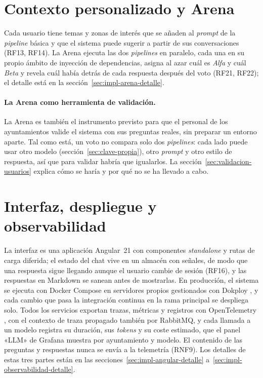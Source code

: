 \section{Contexto personalizado y Arena}
\label{sec:impl-arena}

Cada usuario tiene temas y zonas de interés que se añaden al \emph{prompt} de la \emph{pipeline} básica y que el sistema puede sugerir a partir de sus conversaciones (RF13, RF14). La Arena ejecuta las dos \emph{pipelines} en paralelo, cada una en su propio ámbito de inyección de dependencias, asigna al azar cuál es \emph{Alfa} y cuál \emph{Beta} y revela cuál había detrás de cada respuesta después del voto (RF21, RF22); el detalle está en la sección~\ref{sec:impl-arena-detalle}.

\paragraph{La Arena como herramienta de validación.} La Arena es también el instrumento previsto para que el personal de los ayuntamientos valide el sistema con sus preguntas reales, sin preparar un entorno aparte. Tal como está, un voto no compara solo dos \emph{pipelines}: cada lado puede usar otro modelo (sección~\ref{sec:clave-propia}), otro \emph{prompt} y otro estilo de respuesta, así que para validar habría que igualarlos. La sección~\ref{sec:validacion-usuarios} explica cómo se haría y por qué no se ha llevado a cabo.

\section{Interfaz, despliegue y observabilidad}
\label{sec:impl-angular}
\label{sec:impl-despliegue}
\label{sec:impl-observabilidad}

La interfaz es una aplicación Angular~21 \cite{angular} con componentes \emph{standalone} y rutas de carga diferida; el estado del chat vive en un almacén con señales, de modo que una respuesta sigue llegando aunque el usuario cambie de sesión (RF16), y las respuestas en Markdown se sanean antes de mostrarlas. En producción, el sistema se ejecuta con Docker Compose en servidores propios gestionados con Dokploy \cite{dokploy}, y cada cambio que pasa la integración continua en la rama principal se despliega solo. Todos los servicios exportan trazas, métricas y registros con OpenTelemetry \cite{opentelemetry}, con el contexto de traza propagado también por RabbitMQ, y cada llamada a un modelo registra su duración, sus \emph{tokens} y su coste estimado, que el panel «LLM» de Grafana muestra por ayuntamiento y modelo. El contenido de las preguntas y respuestas nunca se envía a la telemetría (RNF9). Los detalles de estas tres partes están en las secciones~\ref{sec:impl-angular-detalle} a~\ref{sec:impl-observabilidad-detalle}.

